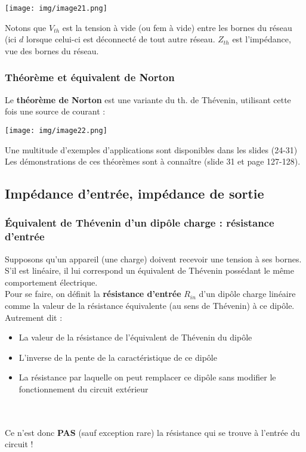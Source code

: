 \begin{center}
	\texttt{[image: img/image21.png]}
\end{center}
Notons que $V_{th}$ est la tension à vide (ou fem à vide) entre les bornes du réseau (ici $d$ lorsque celui-ci est déconnecté de tout autre réseau. 
$Z_{th}$ est l'impédance, vue des bornes du réseau.


\subsubsection{Théorème et équivalent de Norton}
Le \textbf{théorème de Norton} est une variante du th. de Thévenin, utilisant cette fois une source de courant :\\
\begin{center}
	\texttt{[image: img/image22.png]}
\end{center}


Une multitude d'exemples d'applications sont disponibles dans les slides (24-31)\\
Les démonstrations de ces théorèmes sont à connaître (slide 31 et page 127-128).

\subsection{Impédance d'entrée, impédance de sortie}
\subsubsection{Équivalent de Thévenin d'un dipôle charge : résistance d'entrée}
Supposons qu'un appareil (une charge) doivent recevoir une tension à ses bornes. S'il est linéaire, il lui correspond un équivalent de Thévenin possédant le même comportement électrique.\\

Pour se faire, on définit la \textbf{résistance d'entrée} $R_{in}$ d'un dipôle charge linéaire comme la valeur de la résistance équivalente (au sens de Thévenin) à ce dipôle. Autrement dit :
\begin{itemize}
	\item La valeur de la résistance de l'équivalent de Thévenin du dipôle
	\item L'inverse de la pente de la caractéristique de ce dipôle
	\item La résistance par laquelle on peut remplacer ce dipôle sans modifier le fonctionnement du circuit extérieur
\end{itemize}\ \\
\ \\
Ce n'est donc \textbf{PAS} (sauf exception rare) la résistance qui se trouve à l'entrée du circuit !

